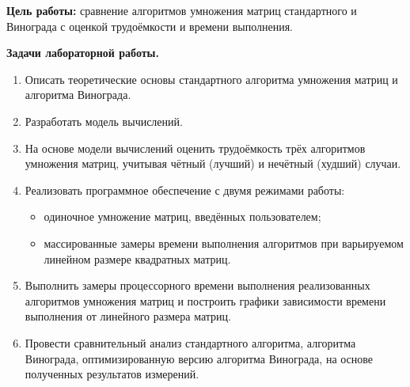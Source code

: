 
\textbf{Цель работы:} сравнение алгоритмов умножения матриц стандартного и Винограда с оценкой трудоёмкости и времени выполнения.

\textbf{Задачи лабораторной работы.}
\begin{enumerate}
	\item Описать теоретические основы стандартного алгоритма умножения матриц и алгоритма Винограда.
	\item Разработать модель вычислений.
	\item На основе модели вычислений оценить трудоёмкость трёх алгоритмов умножения матриц, учитывая чётный (лучший) и нечётный (худший) случаи.
	\item Реализовать программное обеспечение с двумя режимами работы:
	\begin{itemize}
		\item одиночное умножение матриц, введённых пользователем;
		\item массированные замеры времени выполнения алгоритмов при варьируемом линейном размере квадратных матриц.
	\end{itemize}
	\item Выполнить замеры процессорного времени выполнения реализованных алгоритмов умножения матриц и построить графики зависимости времени выполнения от линейного размера матриц.
	\item Провести сравнительный анализ стандартного алгоритма, алгоритма Винограда, оптимизированную версию алгоритма Винограда, на основе полученных результатов измерений.
\end{enumerate}


\clearpage
